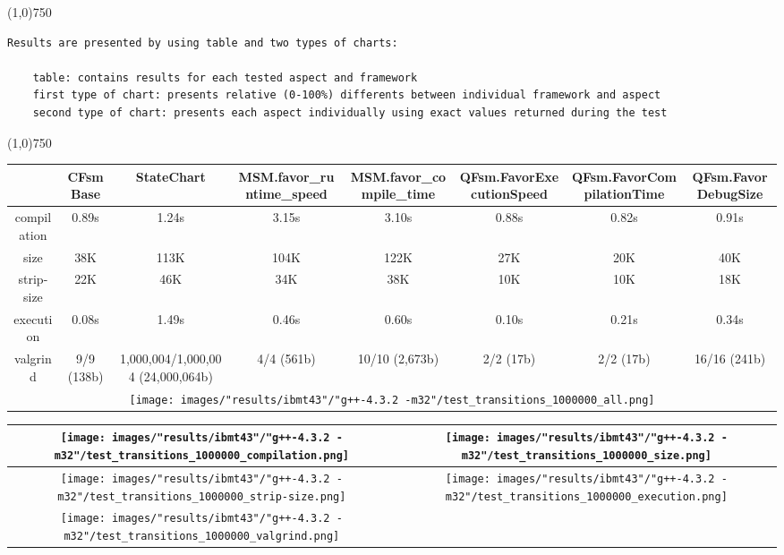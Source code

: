 \begin{center}
\line(1,0){750}
\end{center}
\begin{verbatim}
Results are presented by using table and two types of charts:

    table: contains results for each tested aspect and framework
    first type of chart: presents relative (0-100%) differents between individual framework and aspect
    second type of chart: presents each aspect individually using exact values returned during the test
\end{verbatim}
\begin{center}
\line(1,0){750}
\end{center}
\begin{landscape}
\begin{table}
\caption{"ibmt43" [df6407d], g++-4.3.2 -m32/test transitions 1000000}
\centering
\begin{longtable}{| c | c |c |c |c |c |c |c |}
\hline
& CFsmBase& StateChart& MSM.favor\_runtime\_speed& MSM.favor\_compile\_time& QFsm.FavorExecutionSpeed& QFsm.FavorCompilationTime& QFsm.FavorDebugSize\\
\hline
compilation & 0.89s & 1.24s & 3.15s & 3.10s & 0.88s & 0.82s & 0.91s\\
\hline
size & 38K & 113K & 104K & 122K & 27K & 20K & 40K\\
\hline
strip-size & 22K & 46K & 34K & 38K & 10K & 10K & 18K\\
\hline
execution & 0.08s & 1.49s & 0.46s & 0.60s & 0.10s & 0.21s & 0.34s\\
\hline
valgrind & 9/9 (138b) & 1,000,004/1,000,004 (24,000,064b) & 4/4 (561b) & 10/10 (2,673b) & 2/2 (17b) & 2/2 (17b) & 16/16 (241b)\\
\hline
\multicolumn{8}{|c|}{\texttt{[image: images/"results/ibmt43"/"g++-4.3.2 -m32"/test\_transitions\_1000000\_all.png]}}\\
\hline
\end{longtable}
\end{table}
\end{landscape}
\newpage
\begin{table}
\centering
\begin{longtable}{| c | c |}
\hline
\texttt{[image: images/"results/ibmt43"/"g++-4.3.2 -m32"/test\_transitions\_1000000\_compilation.png]}& \texttt{[image: images/"results/ibmt43"/"g++-4.3.2 -m32"/test\_transitions\_1000000\_size.png]}\\
\hline
\texttt{[image: images/"results/ibmt43"/"g++-4.3.2 -m32"/test\_transitions\_1000000\_strip-size.png]}& \texttt{[image: images/"results/ibmt43"/"g++-4.3.2 -m32"/test\_transitions\_1000000\_execution.png]}\\
\hline
\texttt{[image: images/"results/ibmt43"/"g++-4.3.2 -m32"/test\_transitions\_1000000\_valgrind.png]}& \\ \hline
\end{longtable}
\end{table}
